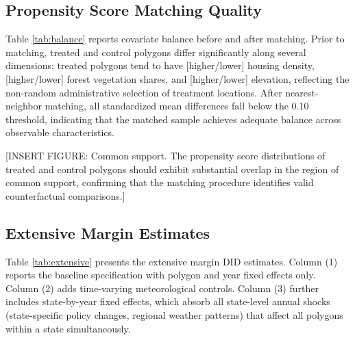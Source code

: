 \documentclass[12pt, letterpaper]{article}
\begin{document}
\subsection{Propensity Score Matching Quality}

Table \ref{tab:balance} reports covariate balance before and after matching. Prior to matching, treated and control polygons differ significantly along several dimensions: treated polygons tend to have [higher/lower] housing density, [higher/lower] forest vegetation shares, and [higher/lower] elevation, reflecting the non-random administrative selection of treatment locations. After nearest-neighbor matching, all standardized mean differences fall below the 0.10 threshold, indicating that the matched sample achieves adequate balance across observable characteristics.

[INSERT FIGURE: Common support. The propensity score distributions of treated and control polygons should exhibit substantial overlap in the region of common support, confirming that the matching procedure identifies valid counterfactual comparisons.]

\subsection{Extensive Margin Estimates}

Table \ref{tab:extensive} presents the extensive margin DID estimates. Column (1) reports the baseline specification with polygon and year fixed effects only. Column (2) adds time-varying meteorological controls. Column (3) further includes state-by-year fixed effects, which absorb all state-level annual shocks (state-specific policy changes, regional weather patterns) that affect all polygons within a state simultaneously.
\end{document}
